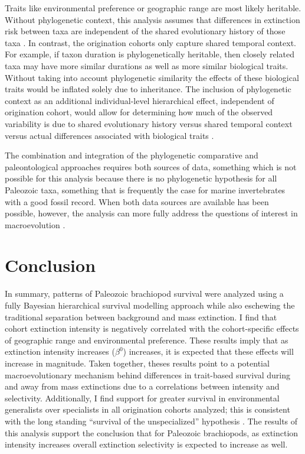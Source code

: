 \documentclass[11pt]{article}
\begin{document}
Traits like environmental preference or geographic range \citep{Jablonski1987,Hunt2005b} are most likely heritable. Without phylogenetic context, this analysis assumes that differences in extinction risk between taxa are independent of the shared evolutionary history of those  taxa \citep{Felsenstein1985b}. In contrast, the origination cohorts only capture shared temporal context. For example, if taxon duration is phylogenetically heritable, then closely related taxa may have more similar durations as well as more similar biological traits. Without taking into account phylogenetic similarity the effects of these biological traits would be inflated solely due to inheritance. The inclusion of phylogenetic context as an additional individual-level hierarchical effect, independent of origination cohort, would allow for determining how much of the observed variability is due to shared evolutionary history versus shared temporal context versus actual differences associated with biological traits \citep{Smits2015}.

The combination and integration of the phylogenetic comparative and paleontological approaches requires both sources of data, something which is not possible for this analysis because there is no phylogenetic hypothesis for all Paleozoic taxa, something that is frequently the case for marine invertebrates with a good fossil record. When both data sources are available has been possible, however, the analysis can more fully address the questions of interest in macroevolution \citep{Smits2015,Slater2013a,Slater2015b,Simpson2011,Tomiya2013,Slater2012,Raia2013c,Raia2012f,Harnik2014,Fritz2013a}.

\section*{Conclusion}
In summary, patterns of Paleozoic brachiopod survival were analyzed using a fully Bayesian hierarchical survival modelling approach while also eschewing the traditional separation between background and mass extinction. I find that cohort extinction intensity is negatively correlated with the cohort-specific effects of geographic range and environmental preference. These results imply that as extinction intensity increases (\(\beta^{0}\)) increases, it is expected that these effects will increase in magnitude. Taken together, theses results point to a potential macroevolutionary mechanism behind differences in trait-based survival during and away from mass extinctions due to a correlations between intensity and selectivity. Additionally, I find support for greater survival in environmental generalists over specialists in all origination cohorts analyzed; this is consistent with the long standing ``survival of the unspecialized'' hypothesis \citep{Liow2004a,Liow2007b,Simpson1944,Simpson1953,Smits2015,Nurnberg2015,Nurnberg2013a, Baumiller1993}. The results of this analysis support the conclusion that for Paleozoic brachiopods, as extinction intensity increases overall extinction selectivity is expected to increase as well.
\end{document}
